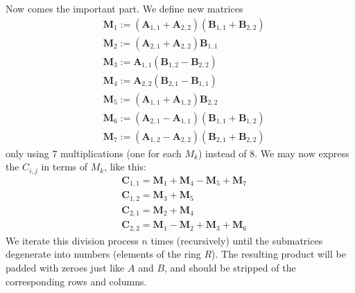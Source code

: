 \documentclass{article}
\begin{document}
Now comes the important part. We define new matrices
$$
\begin{aligned}
& \mathbf{M}_{1} := (\mathbf{A}_{1,1} + \mathbf{A}_{2,2}) (\mathbf{B}_{1,1} + \mathbf{B}_{2,2})\\
& \mathbf{M}_{2} := (\mathbf{A}_{2,1} + \mathbf{A}_{2,2}) \mathbf{B}_{1,1}\\
& \mathbf{M}_{3} := \mathbf{A}_{1,1} (\mathbf{B}_{1,2} - \mathbf{B}_{2,2})\\
& \mathbf{M}_{4} := \mathbf{A}_{2,2} (\mathbf{B}_{2,1} - \mathbf{B}_{1,1})\\
& \mathbf{M}_{5} := (\mathbf{A}_{1,1} + \mathbf{A}_{1,2}) \mathbf{B}_{2,2}\\
& \mathbf{M}_{6} := (\mathbf{A}_{2,1} - \mathbf{A}_{1,1}) (\mathbf{B}_{1,1} + \mathbf{B}_{1,2})\\
& \mathbf{M}_{7} := (\mathbf{A}_{1,2} - \mathbf{A}_{2,2}) (\mathbf{B}_{2,1} + \mathbf{B}_{2,2})
\end{aligned}
$$
only using $7$ multiplications (one for each $M_k$) instead of $8$. We may now express the $C_{i,j}$ in terms of $M_k$, like this:
$$
\begin{aligned}
& \mathbf{C}_{1,1} = \mathbf{M}_{1} + \mathbf{M}_{4} - \mathbf{M}_{5} + \mathbf{M}_{7}\\
& \mathbf{C}_{1,2} = \mathbf{M}_{3} + \mathbf{M}_{5}\\
& \mathbf{C}_{2,1} = \mathbf{M}_{2} + \mathbf{M}_{4}\\
& \mathbf{C}_{2,2} = \mathbf{M}_{1} - \mathbf{M}_{2} + \mathbf{M}_{3} + \mathbf{M}_{6}
\end{aligned}
$$
We iterate this division process $n$ times (recursively) until the submatrices degenerate into numbers (elements of the ring $R$).
The resulting product will be padded with zeroes just like $A$ and $B$, and should be stripped of the corresponding rows and columns.
\end{document}
